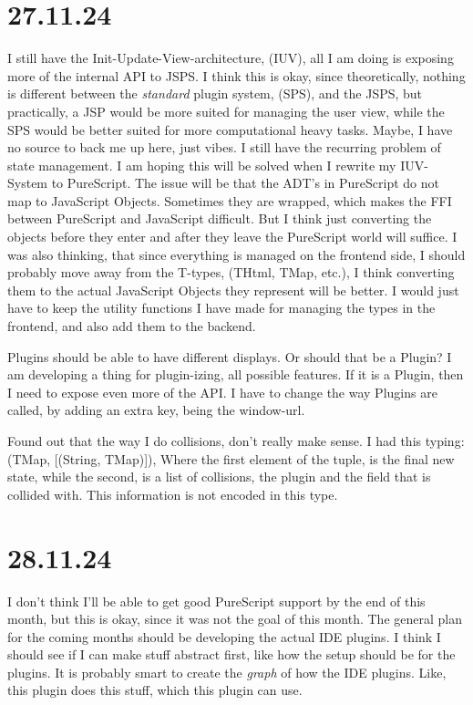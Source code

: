 \section{27.11.24}

I still have the Init-Update-View-architecture, (IUV), all I am doing is
exposing more of the internal API to JSPS. I think this is okay, since
theoretically, nothing is different between the \textit{standard} plugin system,
(SPS), and the JSPS, but practically, a JSP would be more suited for managing
the user view, while the SPS would be better suited for more computational heavy
tasks. Maybe, I have no source to back me up here, just vibes. I still have the
recurring problem of state management. I am hoping this will be solved when I
rewrite my IUV-System to PureScript. The issue will be that the ADT's in
PureScript do not map to JavaScript Objects. Sometimes they are wrapped, which
makes the FFI between PureScript and JavaScript difficult. But I think just
converting the objects before they enter and after they leave the PureScript
world will suffice. I was also thinking, that since everything is managed on
the frontend side, I should probably move away from the T-types, (THtml, TMap,
etc.), I think converting them to the actual JavaScript Objects they represent
will be better. I would just have to keep the utility functions I have made for
managing the types in the frontend, and also add them to the backend.

Plugins should be able to have different displays. Or should that be a Plugin?
I am developing a thing for plugin-izing, all possible features. If it is a
Plugin, then I need to expose even more of the API. I have to change the way
Plugins are called, by adding an extra key, being the window-url.

Found out that the way I do collisions, don't really make sense. I had this
typing: (TMap, [(String, TMap)]), Where the first element of the tuple, is the
final new state, while the second, is a list of collisions, the plugin and the
field that is collided with. This information is not encoded in this type.


\section{28.11.24}

I don't think I'll be able to get good PureScript support by the end of this
month, but this is okay, since it was not the goal of this month. The general
plan for the coming months should be developing the actual IDE plugins. I think
I should see if I can make stuff abstract first, like how the setup should be
for the plugins. It is probably smart to create the \textit{graph} of how the
IDE plugins. Like, this plugin does this stuff, which this plugin can use.


